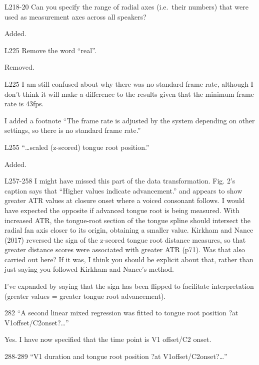\documentclass[]{article}
\begin{document}
L218-20 Can you specify the range of radial axes (i.e.~their numbers)
that were used as measurement axes across all speakers?

\color{plum}

Added. \color{black}

L225 Remove the word ``real''.

\color{plum}

Removed. \color{black}

L225 I am still confused about why there was no standard frame rate,
although I don't think it will make a difference to the results given
that the minimum frame rate is 43fps.

\color{plum}

I added a footnote ``The frame rate is adjusted by the system depending
on other settings, so there is no standard frame rate.'' \color{black}

L255 ``\ldots{}scaled (z-scored) tongue root position.''

\color{plum}

Added. \color{black}

L257-258 I might have missed this part of the data transformation. Fig.
2's caption says that ``Higher values indicate advancement.'' and
appears to show greater ATR values at closure onset where a voiced
consonant follows. I would have expected the opposite if advanced tongue
root is being measured. With increased ATR, the tongue-root section of
the tongue spline should intersect the radial fan axis closer to its
origin, obtaining a smaller value. Kirkham and Nance (2017) reversed the
sign of the z-scored tongue root distance measures, so that greater
distance scores were associated with greater ATR (p71). Was that also
carried out here? If it was, I think you should be explicit about that,
rather than just saying you followed Kirkham and Nance's method.

\color{plum}

I've expanded by saying that the sign has been flipped to facilitate
interpretation (greater values = greater tongue root advancement).
\color{black}

282 ``A second linear mixed regression was fitted to tongue root
position ?at V1offset/C2onset?\ldots{}''

\color{plum}

Yes. I have now specified that the time point is V1 offset/C2 onset.
\color{black}

288-289 ``V1 duration and tongue root position ?at
V1offset/C2onset?\ldots{}''
\end{document}
